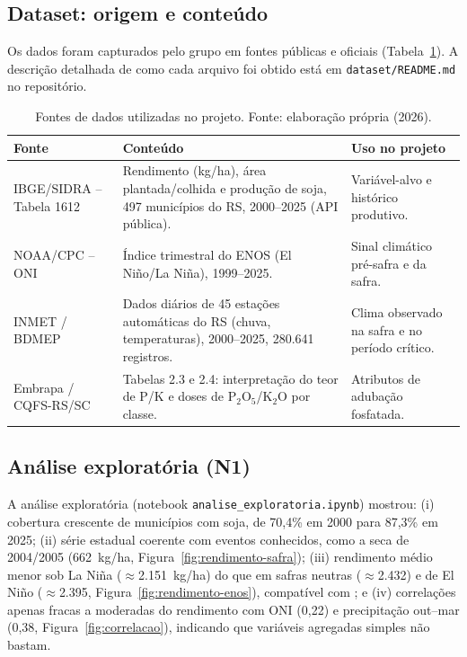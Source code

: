 \documentclass[12pt]{article}
\begin{document}
\subsection{Dataset: origem e conteúdo}
\label{sec:origem-bases}

Os dados foram capturados pelo grupo em fontes públicas e oficiais
(Tabela~\ref{tab:fontes}). A descrição detalhada de como cada arquivo foi
obtido está em \texttt{dataset/README.md} no repositório.

\begin{table}[ht]
\centering
\caption{Fontes de dados utilizadas no projeto. Fonte: elaboração própria (2026).}
\label{tab:fontes}
\footnotesize
\begin{tabular}{|p{2.3cm}|p{5.2cm}|p{4.6cm}|}
\hline
\textbf{Fonte} & \textbf{Conteúdo} & \textbf{Uso no projeto} \\ \hline
IBGE/SIDRA -- Tabela 1612 \cite{ibge} & Rendimento (kg/ha), área plantada/colhida e
  produção de soja, 497 municípios do RS, 2000--2025 (API pública). & Variável-alvo e
  histórico produtivo. \\ \hline
NOAA/CPC -- ONI \cite{noaa} & Índice trimestral do ENOS (El Niño/La Niña), 1999--2025. & Sinal
  climático pré-safra e da safra. \\ \hline
INMET / BDMEP \cite{inmet} & Dados diários de 45 estações automáticas do RS (chuva,
  temperaturas), 2000--2025, 280.641 registros. & Clima observado na safra e
  no período crítico. \\ \hline
Embrapa / CQFS-RS/SC \cite{sbcs2016} & Tabelas 2.3 e 2.4: interpretação do teor de P/K e
  doses de P$_2$O$_5$/K$_2$O por classe. & Atributos de adubação
  fosfatada. \\ \hline
\end{tabular}
\end{table}

\subsection{Análise exploratória (N1)}

A análise exploratória (notebook \texttt{analise\_exploratoria.ipynb})
mostrou: (i) cobertura crescente de municípios com soja, de 70,4\% em 2000
para 87,3\% em 2025; (ii) série estadual coerente com eventos conhecidos,
como a seca de 2004/2005 (662~kg/ha, Figura~\ref{fig:rendimento-safra});
(iii) rendimento médio menor sob La Niña ($\approx$2.151~kg/ha) do que em
safras neutras ($\approx$2.432) e de El Niño ($\approx$2.395,
Figura~\ref{fig:rendimento-enos}), compatível com
\cite{noia2020,pilau2022}; e (iv) correlações apenas fracas a moderadas do
rendimento com ONI (0,22) e precipitação out--mar (0,38,
Figura~\ref{fig:correlacao}), indicando que variáveis agregadas simples não
bastam.
\end{document}
